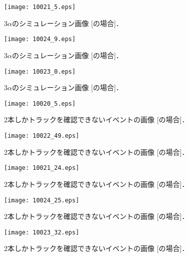 \documentclass[../master]{subfiles}
\begin{document}
\begin{figure}
  \centering
  \texttt{[image: 10021\_5.eps]}
  \caption{3$\alpha$のシミュレーション画像 [\MethaneHerium の場合]．}
  \label{fig::three_alpha_ch4_he}
\end{figure}

\begin{figure}
  \centering
  \texttt{[image: 10024\_9.eps]}
  \caption{3$\alpha$のシミュレーション画像 [\isoButaneHydro の場合]．}
  \label{fig::three_alpha_ic4h10_h2}
\end{figure}

\begin{figure}
  \centering
  \texttt{[image: 10023\_0.eps]}
  \caption{3$\alpha$のシミュレーション画像 [\isoButaneHerium の場合]．}
  \label{fig::three_alpha_ic4h10_he}
\end{figure}
\begin{figure}
  \centering
  \texttt{[image: 10020\_5.eps]}
  \caption{2本しかトラックを確認できないイベントの画像 [\Methane の場合]．}
  \label{fig::not_three_alpha_ch4}
\end{figure}
\begin{figure}
  \centering
  \texttt{[image: 10022\_49.eps]}
  \caption{2本しかトラックを確認できないイベントの画像 [\MethaneHydro の場合]．}
  \label{fig::not_three_alpha_ch4_h2}
\end{figure}
\begin{figure}
  \centering
  \texttt{[image: 10021\_24.eps]}
  \caption{2本しかトラックを確認できないイベントの画像 [\MethaneHerium の場合]．}
  \label{fig::not_three_alpha_ch4_he}
\end{figure}
\begin{figure}
  \centering
  \texttt{[image: 10024\_25.eps]}
  \caption{2本しかトラックを確認できないイベントの画像 [\isoButaneHydro の場合]．}
  \label{fig::not_three_alpha_ic4h10_h2}
\end{figure}
\begin{figure}
  \centering
  \texttt{[image: 10023\_32.eps]}
  \caption{2本しかトラックを確認できないイベントの画像 [\isoButaneHerium の場合]．}
  \label{fig::not_three_alpha_ic4h10_he}
\end{figure}
\end{document}
